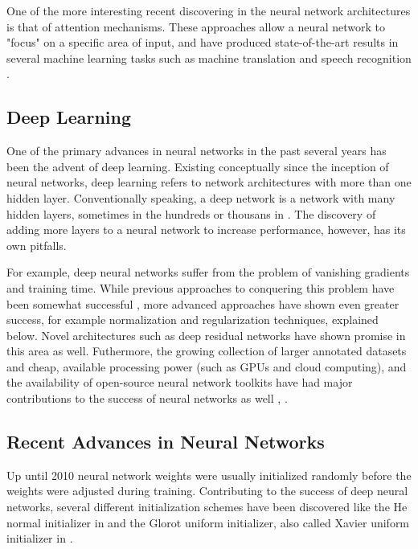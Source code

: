 One of the more interesting recent discovering in the neural network architectures is that of attention mechanisms.  These approaches allow a neural network to "focus" on a specific area of input, and have produced state-of-the-art results in several machine learning tasks such as machine translation and speech recognition \cite{DBLP:journals/corr/JaderbergSZK15}.

\subsection{Deep Learning}

One of the primary advances in neural networks in the past several years has been the advent of deep learning.  Existing conceptually since the inception of neural networks, deep learning refers to network architectures with more than one hidden layer.  Conventionally speaking, a deep network is a network with many hidden layers, sometimes in the hundreds or thousans in \cite{DBLP:journals/corr/HeZRS15}. The discovery of adding more layers to a neural network to increase performance, however, has its own pitfalls.

For example, deep neural networks suffer from the problem of vanishing gradients \cite{Hochreiter:01book} and training time.  While previous approaches to conquering this problem have been somewhat successful \cite{DBLP:journals/corr/abs-1206-5533}, more advanced approaches have shown even greater success, for example normalization and regularization techniques, explained below.  Novel architectures such as deep residual networks \cite{DBLP:journals/corr/HeZRS15} have shown promise in this area as well.  Futhermore, the growing collection of larger annotated datasets and cheap, available processing power (such as GPUs and cloud computing), and the availability of open-source neural network toolkits have had major contributions to the success of neural networks as well \cite{tensorflow2015-whitepaper}, \cite{DBLP:journals/corr/SynnaeveNACLLRU16}. %

\subsection{Recent Advances in Neural Networks}

Up until 2010 neural network weights were usually initialized randomly before the weights were adjusted during training.  Contributing to the success of deep neural networks, several different initialization schemes have been discovered like the He normal initializer in \cite{DBLP:journals/corr/HeZR015} and the Glorot uniform initializer, also called Xavier uniform initializer in \cite{pmlr-v9-glorot10a}.

